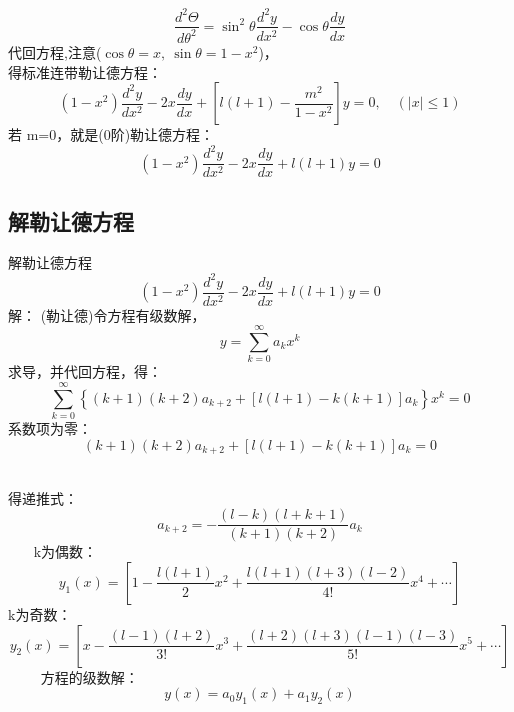 	\begin{equation*}
		\frac{ d^2 \Theta }{d \theta ^2} =\sin ^2 \theta \frac{d^2 y}{d x^2} -\cos \theta \frac{d y}{d x}
	\end{equation*}		
	代回方程,注意($\cos\theta =x,~ \sin  \theta =1-x^2 $)， \\
	得标准连带勒让德方程：
	\begin{equation*}
		\left(1-x^{2}\right) \frac{d^{2} y}{d x^{2}}-2 x \frac{d y}{d x}+\left[l(l+1)-\frac{m^{2}}{1-x^{2}}\right] y=0, \quad (|x|\le 1)
	\end{equation*}		
	若 m=0，就是(0阶)勒让德方程：
	\begin{equation*}
		\left(1-x^{2}\right) \frac{d^{2} y}{d x^{2}}-2 x \frac{d y}{d x}+l(l+1)y=0
	\end{equation*}		
	

\subsection{解勒让德方程}


	{解勒让德方程}
	\begin{equation*}
		\boxed{\left(1-x^{2}\right) \frac{d^{2} y}{d x^{2}}-2 x \frac{d y}{d x}+l(l+1)y=0}
	\end{equation*}		
	{\alert{解：}} (勒让德)令方程有级数解，
	\[ y=\sum_{k=0}^{\infty} a_k x ^k \]
	求导，并代回方程，得：
	\begin{equation*}
		\sum_{k=0}^{\infty}\left\{(k+1)(k+2) a_{k+2}+[l(l+1)-k(k+1)] a_{k}\right\} x^{k}=0
	\end{equation*}	
	系数项为零：
	\begin{equation*}
		(k+1)(k+2) a_{k+2}+[l(l+1)-k(k+1)] a_{k}=0
	\end{equation*}	   
	


	得递推式：
	\begin{equation*}
		a_{k+2}=-\frac{(l-k)(l+k+1)}{(k+1)(k+2) }a_{k}
	\end{equation*}	   
	k为偶数：
	\begin{equation*}
		y_{1}(x)=\left[1-\frac{l(l+1)}{2} x^{2}+\frac{l(l+1)(l+3)(l-2)}{4 !} x^{4}+\cdots\right]
	\end{equation*}	
	k为奇数：
	\begin{equation*}
		y_{2}(x)=\left[x-\frac{(l-1)(l+2)}{3 !} x^{3}+\frac{(l+2)(l+3)(l-1)(l-3)}{5 !} x^{5}+\cdots\right]
	\end{equation*}	    
	方程的级数解：\[ y(x)=  a_{0}y_{1}(x) + a_{1} y_{2}(x)  \]	
	



